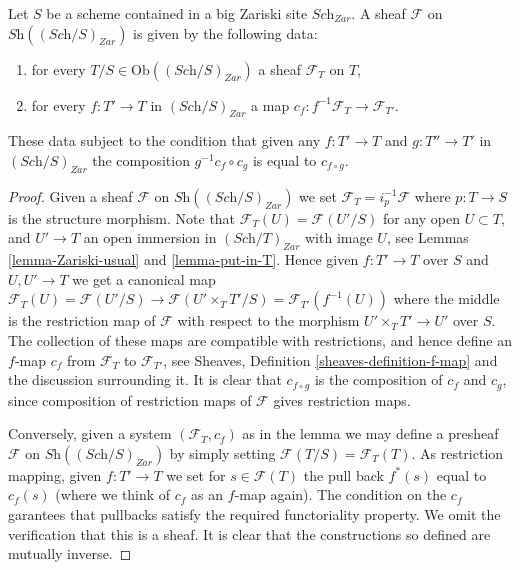 \begin{lemma}
\label{lemma-characterize-sheaf-big}
Let $S$ be a scheme contained in a big Zariski site $\textit{Sch}_{Zar}$.
A sheaf $\mathcal{F}$ on $\textit{Sh}((\textit{Sch}/S)_{Zar})$
is given by the following data:
\begin{enumerate}
\item for every $T/S \in \text{Ob}((\textit{Sch}/S)_{Zar})$ a sheaf
$\mathcal{F}_T$ on $T$,
\item for every $f : T' \to T$ in
$(\textit{Sch}/S)_{Zar}$ a map
$c_f : f^{-1}\mathcal{F}_{T} \to \mathcal{F}_{T'}$.
\end{enumerate}
These data subject to the condition that given any $f : T' \to T$ and
$g : T'' \to T'$ in $(\textit{Sch}/S)_{Zar}$ the composition
$g^{-1}c_f \circ c_g$ is equal to $c_{f \circ g}$.
\end{lemma}

\begin{proof}
Given a sheaf $\mathcal{F}$ on $\textit{Sh}((\textit{Sch}/S)_{Zar})$
we set $\mathcal{F}_T = i_p^{-1}\mathcal{F}$ where $p : T \to S$
is the structure morphism. Note that
$\mathcal{F}_T(U) = \mathcal{F}(U'/S)$ for any open $U \subset T$,
and $U' \to T$ an open immersion in $(\textit{Sch}/T)_{Zar}$
with image $U$, see Lemmas \ref{lemma-Zariski-usual} and \ref{lemma-put-in-T}.
Hence given $f : T' \to T$ over $S$ and $U, U' \to T$ we get a canonical
map $\mathcal{F}_T(U) = \mathcal{F}(U'/S) \to \mathcal{F}(U'\times_TT'/S)
= \mathcal{F}_{T'}(f^{-1}(U))$ where the middle is the restriction map
of $\mathcal{F}$ with respect to the morphism
$U' \times_TT' \to U'$ over $S$. The collection of these maps are
compatible with restrictions, and hence define an $f$-map $c_f$
from $\mathcal{F}_T$ to $\mathcal{F}_{T'}$, see
Sheaves, Definition \ref{sheaves-definition-f-map} and the discussion
surrounding it. It is clear that $c_{f \circ g}$ is the composition of
$c_f$ and $c_g$, since composition of restriction maps of $\mathcal{F}$
gives restriction maps.

\medskip\noindent
Conversely, given a system $(\mathcal{F}_T, c_f)$ as in the lemma
we may define a presheaf $\mathcal{F}$ on $\textit{Sh}((\textit{Sch}/S)_{Zar})$
by simply setting $\mathcal{F}(T/S) = \mathcal{F}_T(T)$. As restriction
mapping, given $f : T' \to T$ we set for $s \in \mathcal{F}(T)$
the pull back $f^*(s)$ equal to $c_f(s)$ (where we think of $c_f$ as
an $f$-map again). The condition on the $c_f$ garantees that
pullbacks satisfy the required functoriality property.
We omit the verification that this is a sheaf.
It is clear that the constructions so defined are mutually inverse.
\end{proof}























